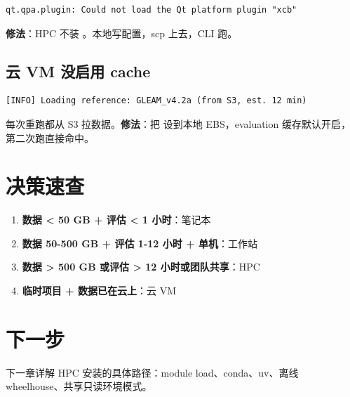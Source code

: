 \begin{verbatim}
qt.qpa.plugin: Could not load the Qt platform plugin "xcb"
\end{verbatim}

\textbf{修法}：HPC 不装 \cli{[gui]}。本地写配置，scp 上去，CLI 跑。

\subsection{云 VM 没启用 cache}

\begin{verbatim}
[INFO] Loading reference: GLEAM_v4.2a (from S3, est. 12 min)
\end{verbatim}

每次重跑都从 S3 拉数据。\textbf{修法}：把  设到本地 EBS，evaluation 缓存默认开启，第二次跑直接命中。

\section{决策速查}

\begin{enumerate}
  \item \textbf{数据 < 50 GB + 评估 < 1 小时}：笔记本
  \item \textbf{数据 50-500 GB + 评估 1-12 小时 + 单机}：工作站
  \item \textbf{数据 > 500 GB 或评估 > 12 小时或团队共享}：HPC
  \item \textbf{临时项目 + 数据已在云上}：云 VM
\end{enumerate}

\section{下一步}

下一章详解 HPC 安装的具体路径：module load、conda、uv、离线 wheelhouse、共享只读环境模式。
